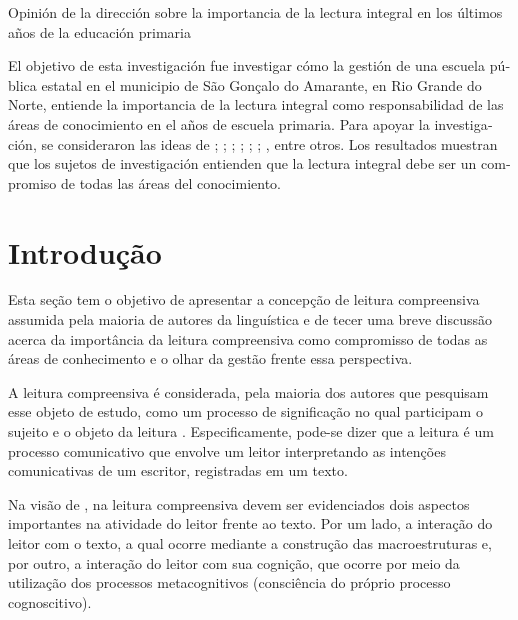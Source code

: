 \begin{refsection}
    \begin{otherlanguage}{spanish}
    
    \fakeChapterOneLine
    {Opinión de la dirección sobre la importancia de la lectura integral en los últimos años de la educación primaria}
    
    \begin{galoResumo}[Resumen]
        El objetivo de esta investigación fue investigar cómo la gestión de una escuela pública estatal en el municipio de São Gonçalo do Amarante, en Rio Grande do Norte, entiende la importancia de la lectura integral como responsabilidad de las áreas de conocimiento en el años de escuela primaria. Para apoyar la investigación, se consideraron las ideas de \textcite{Leffa1996Fatores}; \textcite{Geraldi1991Psicopedagogia}; \textcite{RojasEtAl2009Dificuldades}; \textcite{Lenner2002Ler}; \textcite{DiretrizesCur2013, BaNacCurEF2017}; \textcite{Sole1998Estrategias}; \textcite{BagnoEtAl2002Lingua}, entre otros. Los resultados muestran que los sujetos de investigación entienden que la lectura integral debe ser un compromiso de todas las áreas del conocimiento.
    \end{galoResumo}
    
    \end{otherlanguage}
    
    
    \section{Introdução}

    Esta seção tem o objetivo de apresentar a concepção de leitura compreensiva assumida pela maioria de autores da linguística e de tecer uma breve discussão acerca da importância da leitura compreensiva como compromisso de todas as áreas de conhecimento e o olhar da gestão frente essa perspectiva. 

    A leitura compreensiva é considerada, pela maioria dos autores que pesquisam esse objeto de estudo, como um processo de significação no qual participam o sujeito e o objeto da leitura \cite{Leffa1996Fatores, VanDijk1997}. Especificamente, pode-se dizer que a leitura é um processo comunicativo que envolve um leitor interpretando as intenções comunicativas de um escritor, registradas em um texto.    

    Na visão de \textcite{JouAndSperb2003Leitura}, na leitura compreensiva devem ser evidenciados dois aspectos importantes na atividade do leitor frente ao texto.  Por um lado, a interação do leitor com o texto, a qual ocorre mediante a construção das macroestruturas e, por outro, a interação do leitor com sua cognição, que ocorre por meio da utilização dos processos metacognitivos (consciência do próprio processo cognoscitivo).  


\end{refsection}
